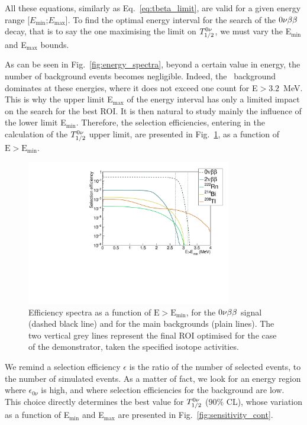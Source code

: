 All these equations, similarly as Eq.~\eqref{eq:tbeta_limit}, are valid for a given energy range [$E_{\text{min}}$;$E_{\text{max}}$].
To find the optimal energy interval for the search of the $0\nu\beta\beta$ decay, that is to say the one maximising the limit on $T_{1/2}^{0\nu}$, we must vary the E$_{\text{min}}$ and E$_{\text{max}}$ bounds.

As can be seen in Fig.~\ref{fig:energy_spectra}, beyond a certain value in energy, the number of background events becomes negligible.
Indeed, the \Tl\ background dominates at these energies, where it does not exceed one count for E$>3.2$~MeV.
This is why the upper limit E$_{\text{max}}$ of the energy interval has only a limited impact on the search for the best ROI.
It is then natural to study mainly the influence of the lower limit E$_{\text{min}}$.
Therefore, the selection efficiencies, entering in the calculation of the $T_{1/2}^{0\nu}$ upper limit, are presented in Fig.~\ref{fig:efficiency_spectra}, as a function of $\text{E}>\text{E}_{\text{min}}$.
\begin{figure}[h]
  \centering
  \includegraphics[width=0.8\textwidth]{Sensitivity/fig_sensitivity/efficiency_spectrum_with_B_82Se.pdf}
  \caption{Efficiency spectra as a function of $\text{E}>\text{E}_{\text{min}}$, for the $0\nu\beta\beta$ signal (dashed black line) and for the main backgrounds (plain lines).
    The two vertical grey lines represent the final ROI optimised for the case of the demonstrator, taken the specified isotope activities.
    \label{fig:efficiency_spectra}}
\end{figure}
We remind a selection efficiency $\epsilon$ is the ratio of the number of selected events, to the number of simulated events.
As a matter of fact, we look for an energy region where $\epsilon_{0\nu}$ is high, and where selection efficiencies for the background are low.
This choice directly determines the best value for $T_{1/2}^{0\nu}$ ($90\%$ CL), whose variation as a function of E$_{\text{min}}$ and E$_{\text{max}}$ are presented in Fig.~\ref{fig:sensitivity_cont}.
